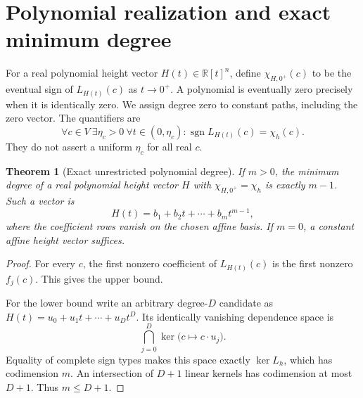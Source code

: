 \documentclass[11pt,a4paper]{article}
\numberwithin{equation}{section}
\newtheorem{theorem}{Theorem}[section]
\theoremstyle{plain}
\newcommand{\R}{\mathbb R}
\newcommand{\sgn}{\operatorname{sgn}}
\begin{document}
\section{Polynomial realization and exact minimum degree}
\label{poly:sec:degree}

For a real polynomial height vector $H(t)\in\R[t]^n$, define
$\chi_{H,0^+}(c)$ to be the eventual sign of $L_{H(t)}(c)$ as $t\to0^+$.
A polynomial is eventually zero precisely when it is identically zero.
We assign degree zero to constant paths, including the zero vector.
The quantifiers are
\[
 \forall c\in V\ \exists\eta_c>0\ \forall t\in(0,\eta_c):
 \sgn L_{H(t)}(c)=\chi_h(c).
\]
They do not assert a uniform $\eta_c$ for all real $c$.

\begin{theorem}[Exact unrestricted polynomial degree]\label{poly:thm:degree}
If $m>0$, the minimum degree of a real polynomial height vector $H$ with
$\chi_{H,0^+}=\chi_h$ is exactly $m-1$. Such a vector is
\begin{equation}\label{poly:eq:poly}
 H(t)=b_1+b_2t+\cdots+b_mt^{m-1},
\end{equation}
where the coefficient rows vanish on the chosen affine basis. If $m=0$,
a constant affine height vector suffices.
\end{theorem}
\begin{proof}
For every $c$, the first nonzero coefficient of $L_{H(t)}(c)$ is the first
nonzero $f_j(c)$. This gives the upper bound.

For the lower bound write an arbitrary degree-$D$ candidate as
$H(t)=u_0+u_1t+\cdots+u_Dt^D$. Its identically vanishing dependence
space is
\[
 \bigcap_{j=0}^D\ker\bigl(c\mapsto c\cdot u_j\bigr).
\]
Equality of complete sign types makes this space exactly $\ker L_h$,
which has codimension $m$. An intersection of $D+1$ linear kernels has
codimension at most $D+1$. Thus $m\le D+1$.
\end{proof}
\end{document}
